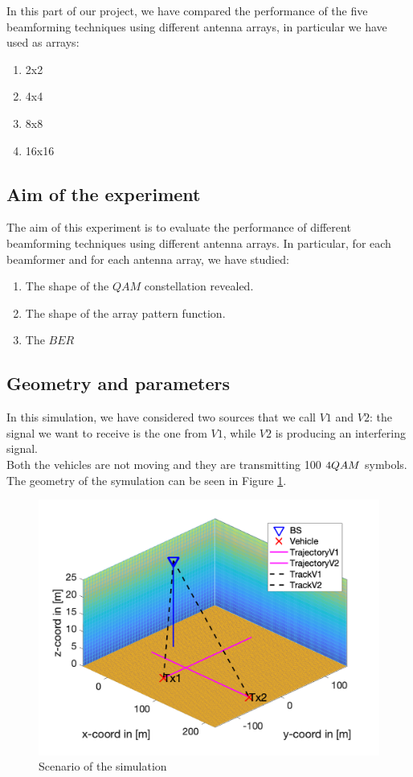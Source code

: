 In this part of our project, we have compared the performance of the five beamforming techniques using different antenna arrays,
in particular we have used as arrays:

\begin{enumerate}
    \item 2x2
    \item 4x4
    \item 8x8
    \item 16x16
\end{enumerate}

\subsection{Aim of the experiment}

The aim of this experiment is to evaluate the performance of different beamforming techniques using different antenna arrays. In 
particular, for each beamformer and for each antenna array, we have studied:

\begin{enumerate}
    \item The shape of the $QAM$ constellation revealed. 
    \item The shape of the array pattern function.
    \item The $BER$
\end{enumerate}

\subsection{Geometry and parameters}

In this simulation, we have considered two sources that we call $V1$ and $V2$: the signal we want to receive is the one from $V1$,
while $V2$ is producing an interfering signal.\\ 
Both the vehicles are not moving and they are transmitting 100 $4\-QAM$ symbols.\\
The geometry of the symulation can be seen in Figure \ref{fig:Scenario_still}.

\begin{figure}[ht]
    \includegraphics[width=\linewidth]{Quadriga1.png}
    \caption{Scenario of the simulation}
    \label{fig:Scenario_still}
\end{figure}

